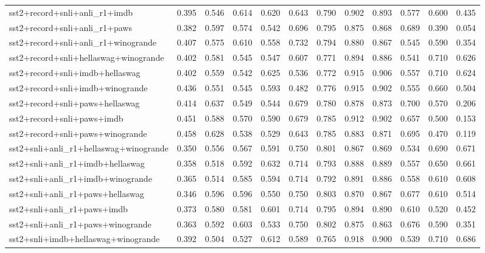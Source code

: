 \begin{table}[t]
\begin{tabular}{lrrrrrrrrrrr}
    sst2+record+snli+anli\_r1+imdb & 0.395 & 0.546 & 0.614 & 0.620 & 0.643 & 0.790 & 0.902 & 0.893 & 0.577 & 0.600 & 0.435 \\
    sst2+record+snli+anli\_r1+paws & 0.382 & 0.597 & 0.574 & 0.542 & 0.696 & 0.795 & 0.875 & 0.868 & 0.689 & 0.390 & 0.054 \\
    sst2+record+snli+anli\_r1+winogrande & 0.407 & 0.575 & 0.610 & 0.558 & 0.732 & 0.794 & 0.880 & 0.867 & 0.545 & 0.590 & 0.354 \\
    sst2+record+snli+hellaswag+winogrande & 0.402 & 0.581 & 0.545 & 0.547 & 0.607 & 0.771 & 0.894 & 0.886 & 0.541 & 0.710 & 0.626 \\
    sst2+record+snli+imdb+hellaswag & 0.402 & 0.559 & 0.542 & 0.625 & 0.536 & 0.772 & 0.915 & 0.906 & 0.557 & 0.710 & 0.624 \\
    sst2+record+snli+imdb+winogrande & 0.436 & 0.551 & 0.545 & 0.593 & 0.482 & 0.776 & 0.915 & 0.902 & 0.555 & 0.660 & 0.504 \\
    sst2+record+snli+paws+hellaswag & 0.414 & 0.637 & 0.549 & 0.544 & 0.679 & 0.780 & 0.878 & 0.873 & 0.700 & 0.570 & 0.206 \\
    sst2+record+snli+paws+imdb & 0.451 & 0.588 & 0.570 & 0.590 & 0.679 & 0.785 & 0.912 & 0.902 & 0.657 & 0.500 & 0.153 \\
    sst2+record+snli+paws+winogrande & 0.458 & 0.628 & 0.538 & 0.529 & 0.643 & 0.785 & 0.883 & 0.871 & 0.695 & 0.470 & 0.119 \\
    sst2+snli+anli\_r1+hellaswag+winogrande & 0.350 & 0.556 & 0.567 & 0.591 & 0.750 & 0.801 & 0.867 & 0.869 & 0.534 & 0.690 & 0.671 \\
    sst2+snli+anli\_r1+imdb+hellaswag & 0.358 & 0.518 & 0.592 & 0.632 & 0.714 & 0.793 & 0.888 & 0.889 & 0.557 & 0.650 & 0.661 \\
    sst2+snli+anli\_r1+imdb+winogrande & 0.365 & 0.514 & 0.585 & 0.594 & 0.714 & 0.792 & 0.891 & 0.886 & 0.558 & 0.610 & 0.608 \\
    sst2+snli+anli\_r1+paws+hellaswag & 0.346 & 0.596 & 0.596 & 0.550 & 0.750 & 0.803 & 0.870 & 0.867 & 0.677 & 0.610 & 0.514 \\
    sst2+snli+anli\_r1+paws+imdb & 0.373 & 0.580 & 0.581 & 0.601 & 0.714 & 0.795 & 0.894 & 0.890 & 0.610 & 0.520 & 0.452 \\
    sst2+snli+anli\_r1+paws+winogrande & 0.363 & 0.592 & 0.603 & 0.533 & 0.750 & 0.802 & 0.875 & 0.863 & 0.676 & 0.590 & 0.351 \\
    sst2+snli+imdb+hellaswag+winogrande & 0.392 & 0.504 & 0.527 & 0.612 & 0.589 & 0.765 & 0.918 & 0.900 & 0.539 & 0.710 & 0.686 \\

\end{tabular}
\end{table}
